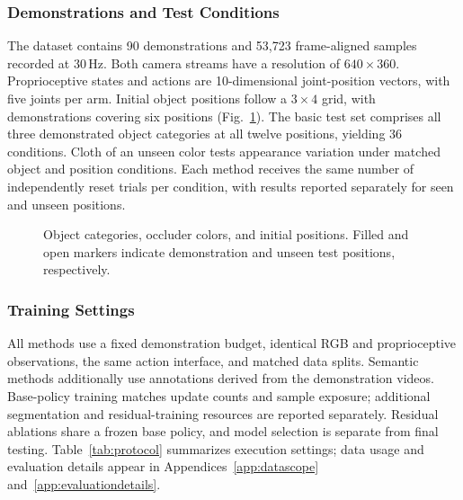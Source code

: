 \subsubsection{Demonstrations and Test Conditions}
The dataset contains 90 demonstrations and 53,723 frame-aligned samples recorded at 30\,Hz.
Both camera streams have a resolution of $640\times360$.
Proprioceptive states and actions are 10-dimensional joint-position vectors, with five joints per arm.
Initial object positions follow a $3\times4$ grid, with demonstrations covering six positions (Fig.~\ref{fig:objectpositions}).
The basic test set comprises all three demonstrated object categories at all twelve positions, yielding 36 conditions.
Cloth of an unseen color tests appearance variation under matched object and position conditions.
Each method receives the same number of independently reset trials per condition, with results reported separately for seen and unseen positions.

\begin{figure}[!tb]
\centering
\caption{Object categories, occluder colors, and initial positions. Filled and open markers indicate demonstration and unseen test positions, respectively.}
\label{fig:objectpositions}
\end{figure}

\subsubsection{Training Settings}
All methods use a fixed demonstration budget, identical RGB and proprioceptive observations, the same action interface, and matched data splits.
Semantic methods additionally use annotations derived from the demonstration videos.
Base-policy training matches update counts and sample exposure; additional segmentation and residual-training resources are reported separately.
Residual ablations share a frozen base policy, and model selection is separate from final testing.
Table~\ref{tab:protocol} summarizes execution settings; data usage and evaluation details appear in Appendices~\ref{app:datascope} and~\ref{app:evaluationdetails}.

